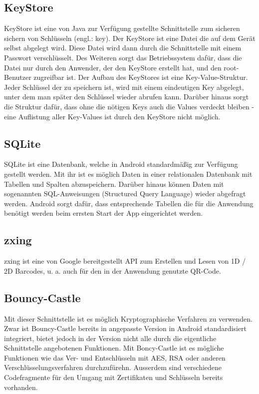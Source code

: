 \documentclass[10pt, a4paper]{scrreprt}
\begin{document}
\subsection{KeyStore}
KeyStore ist eine von Java zur Verfügung gestellte Schnittstelle zum sicheren sichern von Schlüsseln  (engl.: key). Der KeyStore ist eine Datei die auf dem Gerät selbst abgelegt wird. Diese Datei wird dann durch die Schnittstelle mit einem Passwort verschlüsselt. Des Weiteren sorgt das Betriebssystem dafür, dass die Datei nur durch den Anwender, der den KeyStore erstellt hat, und den root-Benutzer zugreifbar ist. Der Aufbau des KeyStores ist eine Key-Value-Struktur. Jeder Schlüssel der zu speichern ist, wird mit einem eindeutigen Key abgelegt, unter dem man später den Schlüssel wieder abrufen kann. Darüber hinaus sorgt die Struktur dafür, dass ohne die nötigen Keys auch die Values verdeckt bleiben - eine Auflistung aller Key-Values ist durch den KeyStore nicht möglich. %


\subsection{SQLite}
SQLite ist eine Datenbank, welche in Android standardmäßig zur Verfügung gestellt werden. Mit ihr ist es möglich Daten in einer relationalen Datenbank mit Tabellen und Spalten abzuspeichern. Darüber hinaus können Daten mit sogenannten SQL-Anweisungen (Structured Query Language) wieder abgefragt werden. Android sorgt dafür, dass entsprechende Tabellen die für die Anwendung benötigt werden beim errsten Start der App eingerichtet werden. 


\subsection{zxing}
zxing ist eine von Google bereitgestellt API zum Erstellen und Lesen von 1D / 2D Barcodes, u. a. auch für den in der Anwendung genutzte QR-Code.


\subsection{Bouncy-Castle}
Mit dieser Schnittstelle ist es möglich Kryptographische Verfahren zu verwenden. Zwar ist Bouncy-Castle bereits in angepasste Version in Android standardisiert integriert, bietet jedoch in der Version nicht alle durch die eigentliche Schnittstelle angebotenen Funktionen. Mit Boncy-Castle ist es mögliche Funktionen wie das Ver- und Entschlüsseln mit AES, RSA oder anderen Verschlüsselungsverfahren durchzufürehn. Ausserdem sind verschiedene Codefragmente für den Umgang mit Zertifikaten und Schlüsseln bereits vorhanden.
\end{document}
